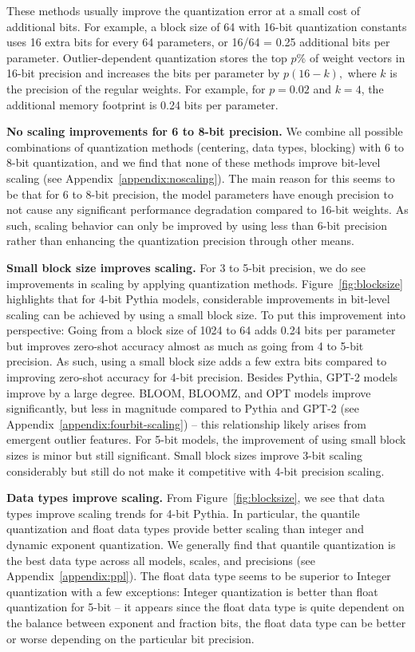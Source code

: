 These methods usually improve the quantization error at a small cost of additional bits. For example, a block size of 64 with 16-bit quantization constants uses 16 extra bits for every 64 parameters, or 16/64 = 0.25 additional bits per parameter. Outlier-dependent quantization stores the top $p$\% of weight vectors in 16-bit precision and increases the bits per parameter by $p(16-k),$ where $k$ is the precision of the regular weights. For example, for $p=0.02$ and $k=4$, the additional memory footprint is 0.24 bits per parameter.

\textbf{No scaling improvements for 6 to 8-bit precision.} We combine all possible combinations of quantization methods (centering, data types, blocking) with 6 to 8-bit quantization, and we find that none of these methods improve bit-level scaling (see Appendix~\ref{appendix:noscaling}). The main reason for this seems to be that for 6 to 8-bit precision, the model parameters have enough precision to not cause any significant performance degradation compared to 16-bit weights. As such, scaling behavior can only be improved by using less than 6-bit precision rather than enhancing the quantization precision through other means.

\textbf{Small block size improves scaling.} For 3 to 5-bit precision, we do see improvements in scaling by applying quantization methods. Figure~\ref{fig:blocksize} highlights that for 4-bit Pythia models, considerable improvements in bit-level scaling can be achieved by using a small block size. To put this improvement into perspective: Going from a block size of 1024 to 64 adds 0.24 bits per parameter but improves zero-shot accuracy almost as much as going from 4 to 5-bit precision. As such, using a small block size adds a few extra bits compared to improving zero-shot accuracy for 4-bit precision. Besides Pythia, GPT-2 models improve by a large degree. BLOOM, BLOOMZ, and OPT models improve significantly, but less in magnitude compared to Pythia and GPT-2 (see Appendix~\ref{appendix:fourbit-scaling}) -- this relationship likely arises from emergent outlier features. For 5-bit models, the improvement of using small block sizes is minor but still significant. Small block sizes improve 3-bit scaling considerably but still do not make it competitive with 4-bit precision scaling.

\textbf{Data types improve scaling.} From Figure~\ref{fig:blocksize}, we see that data types improve scaling trends for 4-bit Pythia. In particular, the quantile quantization and float data types provide better scaling than integer and dynamic exponent quantization. We generally find that quantile quantization is the best data type across all models, scales, and precisions (see Appendix~\ref{appendix:ppl}). The float data type seems to be superior to Integer quantization with a few exceptions: Integer quantization is better than float quantization for 5-bit -- it appears since the float data type is quite dependent on the balance between exponent and fraction bits, the float data type can be better or worse depending on the particular bit precision. 

